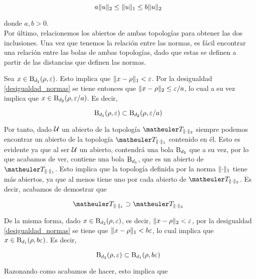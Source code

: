 \begin{equation}\label{desigualdad_normas}
a\lVert u\rVert_2\le \lVert u\rVert_1\le b\lVert u\rVert_2
\end{equation}

donde $a,b>0$.\\



Por último, relacionemos los abiertos de ambas topologías para obtener las dos inclusiones. Una vez que tenemos la relación entre las normas, es fácil encontrar una relación entre las bolas de ambas topologías, dado que estas se definen a partir de las distancias que definen las normas.


Sea $x\in \operatorname{B}_{d_1}(\rho,\varepsilon)$. Esto implica que $\lVert x-\rho\rVert_1<\varepsilon$. Por la desigualdad \eqref{desigualdad_normas} se tiene entonces que $\lVert x-\rho\rVert_2\le\varepsilon/a$, lo cual a su vez implica que $x\in \operatorname{B}_{d_2}(\rho,\varepsilon/a)$. Es decir,

\begin{equation*}
\operatorname{B}_{d_1}(\rho,\varepsilon)\subset \operatorname{B}_{d_2}(\rho,\varepsilon/a)
\end{equation*}

Por tanto, dado $\mathcal{U}$ un abierto de la topología $\T_{\norm{\cdot}_2}$ siempre podemos encontrar un abierto de la topología $\T_{\norm{\cdot}_1}$ contenido en él. Esto es evidente ya que al ser $\mathcal{U}$ un abierto, contendrá una bola $\operatorname{B}_{d_2}$ que a su vez, por lo que acabamos de ver, contiene una bola $\operatorname{B}_{d_1}$, que es un abierto de $\T_{\norm{\cdot}_1}$. Esto implica que la topología definida por la norma $\lVert\cdot\rVert_1$ tiene más abiertos, ya que al menos tiene uno por cada abierto de $\T_{\norm{\cdot}_2}$. Es decir, acabamos de demostrar que

\begin{equation*}
\T_{\norm{\cdot}_1}\supset\T_{\norm{\cdot}_2}
\end{equation*}


De la misma forma, dado $x\in \operatorname{B}_{d_2}(\rho,\varepsilon)$, es decir, $\lVert x-\rho\rVert_2<\varepsilon$, por la desigualdad \eqref{desigualdad_normas} se tiene que $\lVert x-\rho\rVert_1<b\varepsilon$, lo cual implica que $x\in \operatorname{B}_{d_1}(\rho,b\varepsilon)$. Es decir,

\begin{equation*}
\operatorname{B}_{d_2}(\rho,\varepsilon)\subset \operatorname{B}_{d_1}(\rho,b\varepsilon)
\end{equation*}


Razonando como acabamos de hacer, esto implica que

